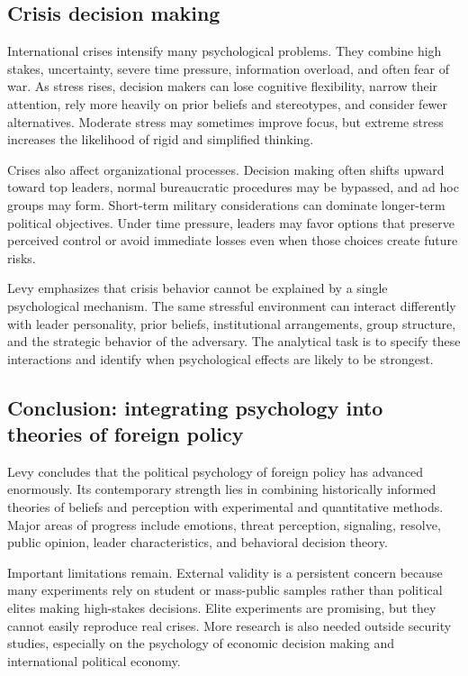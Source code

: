 \subsection{Crisis decision making}

International crises intensify many psychological problems. They combine high stakes, uncertainty, severe time pressure, information overload, and often fear of war. As stress rises, decision makers can lose cognitive flexibility, narrow their attention, rely more heavily on prior beliefs and stereotypes, and consider fewer alternatives. Moderate stress may sometimes improve focus, but extreme stress increases the likelihood of rigid and simplified thinking.

Crises also affect organizational processes. Decision making often shifts upward toward top leaders, normal bureaucratic procedures may be bypassed, and ad hoc groups may form. Short-term military considerations can dominate longer-term political objectives. Under time pressure, leaders may favor options that preserve perceived control or avoid immediate losses even when those choices create future risks.

Levy emphasizes that crisis behavior cannot be explained by a single psychological mechanism. The same stressful environment can interact differently with leader personality, prior beliefs, institutional arrangements, group structure, and the strategic behavior of the adversary. The analytical task is to specify these interactions and identify when psychological effects are likely to be strongest.

\subsection{Conclusion: integrating psychology into theories of foreign policy}

Levy concludes that the political psychology of foreign policy has advanced enormously. Its contemporary strength lies in combining historically informed theories of beliefs and perception with experimental and quantitative methods. Major areas of progress include emotions, threat perception, signaling, resolve, public opinion, leader characteristics, and behavioral decision theory.

Important limitations remain. External validity is a persistent concern because many experiments rely on student or mass-public samples rather than political elites making high-stakes decisions. Elite experiments are promising, but they cannot easily reproduce real crises. More research is also needed outside security studies, especially on the psychology of economic decision making and international political economy.

